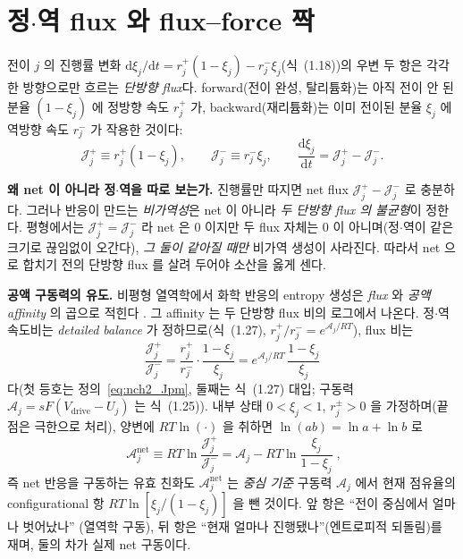 \documentclass[11pt,a4paper]{article}
\newcommand{\dd}{\mathrm{d}}
\newcommand{\drive}{\mathrm{drive}}
\begin{document}
\section{정$\cdot$역 flux 와 flux--force 짝}\label{sec:nch2_flux}
전이 $j$ 의 진행률 변화 $\dd\xi_j/\dd t=r_j^+(1-\xi_j)-r_j^-\xi_j$(식~(1.18))의 우변 두 항은 각각 한 방향으로만
흐르는 \emph{단방향 flux}다. forward(전이 완성, 탈리튬화)는 아직 전이 안 된 분율 $(1-\xi_j)$ 에 정방향 속도
$r_j^+$ 가, backward(재리튬화)는 이미 전이된 분율 $\xi_j$ 에 역방향 속도 $r_j^-$ 가 작용한 것이다:
\begin{equation}
\mathcal J_j^+\equiv r_j^+(1-\xi_j),\qquad \mathcal J_j^-\equiv r_j^-\xi_j,\qquad
\frac{\dd\xi_j}{\dd t}=\mathcal J_j^+-\mathcal J_j^-.
\label{eq:nch2_Jpm}
\end{equation}

\textbf{왜 net 이 아니라 정$\cdot$역을 따로 보는가.} 진행률만 따지면 net flux $\mathcal J_j^+-\mathcal J_j^-$ 로
충분하다. 그러나 반응이 만드는 \emph{비가역성}은 net 이 아니라 \emph{두 단방향 flux 의 불균형}이 정한다.
평형에서는 $\mathcal J_j^+=\mathcal J_j^-$ 라 net 은 $0$ 이지만 두 flux 자체는 $0$ 이 아니며(정$\cdot$역이 같은
크기로 끊임없이 오간다), \emph{그 둘이 같아질 때만} 비가역 생성이 사라진다. 따라서 net 으로 합치기 전의 단방향
flux 를 살려 두어야 소산을 옳게 센다.

\textbf{공액 구동력의 유도.} 비평형 열역학에서 화학 반응의 entropy 생성은 \emph{flux} 와 \emph{공액 affinity} 의
곱으로 적힌다 \cite{degrootmazur1962,prigogine1967}. 그 affinity 는 두 단방향 flux 비의 로그에서 나온다. 정$\cdot$역
속도비는 \emph{detailed balance} 가 정하므로(식~(1.27), $r_j^+/r_j^-=e^{\mathcal A_j/RT}$), flux 비는
\begin{equation}
\frac{\mathcal J_j^+}{\mathcal J_j^-}=\frac{r_j^+}{r_j^-}\cdot\frac{1-\xi_j}{\xi_j}
=e^{\mathcal A_j/RT}\,\frac{1-\xi_j}{\xi_j}
\label{eq:nch2_Jratio}
\end{equation}
다(첫 등호는 정의~\eqref{eq:nch2_Jpm}, 둘째는 식~(1.27) 대입; 구동력 $\mathcal A_j=sF(V_\drive-U_j)$ 는
식~(1.25)). 내부 상태 $0<\xi_j<1$, $r_j^\pm>0$ 을 가정하며(끝점은 극한으로 처리), 양변에 $RT\ln(\cdot)$ 을
취하면 $\ln(ab)=\ln a+\ln b$ 로
\begin{equation}
\boxed{\;\mathcal A_j^{\mathrm{net}}\equiv RT\ln\frac{\mathcal J_j^+}{\mathcal J_j^-}
=\mathcal A_j-RT\ln\frac{\xi_j}{1-\xi_j}\;,}
\label{eq:nch2_Anet}
\end{equation}
즉 net 반응을 구동하는 유효 친화도 $\mathcal A_j^{\mathrm{net}}$ 는 \emph{중심 기준} 구동력 $\mathcal A_j$ 에서
현재 점유율의 configurational 항 $RT\ln[\xi_j/(1-\xi_j)]$ 을 뺀 것이다. 앞 항은 ``전이 중심에서 얼마나 벗어났나''
(열역학 구동), 뒤 항은 ``현재 얼마나 진행됐나''(엔트로피적 되돌림)를 재며, 둘의 차가 실제 net 구동이다.
\end{document}

